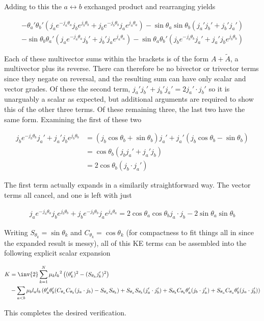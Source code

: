Adding to this the $a \leftrightarrow b$ exchanged product and rearranging yields

\begin{align*}
- \theta_a' \theta_b' (j_a e^{-j_a \theta_a} j_b e^{j_b\theta_b} + j_b e^{-j_b \theta_b} j_a e^{j_a\theta_a} ) - \sin\theta_a \sin\theta_b (j_a' j_b' + j_b' j_a') \\
- \sin\theta_b \theta_a' ( j_a e^{-j_a \theta_a} j_b' + j_b' j_a e^{j_a \theta_a} )
- \sin\theta_a \theta_b' ( j_b e^{-j_b \theta_b} j_a' + j_a' j_b e^{j_b \theta_b} )
\end{align*}

Each of these multivector sums within the brackets is of the form $A + \tilde{A}$, a multivector plus its reverse.  There can therefore be no bivector or trivector terms since they negate on reversal, and the resulting sum can have only scalar and vector grades.  Of these the second term, $j_a' j_b' + j_b' j_a' = 2 j_a' \cdot j_b'$ so it is unarguably a scalar as expected, but additional arguments are required to show this of the other three terms.  Of these remaining three, the last two have the same form.  Examining the first of these two

\begin{align*}
j_b e^{-j_b \theta_b} j_a' + j_a' j_b e^{j_b \theta_b} 
&=
(j_b \cos\theta_b + \sin\theta_b) j_a' + j_a' (j_b \cos\theta_b - \sin\theta_b) \\
&=
\cos\theta_b (j_b j_a' + j_a' j_b ) \\
&=
2 \cos\theta_b (j_b \cdot j_a')
\end{align*}

The first term actually expands in a similarily straightforward way.  The vector terms all cancel, and one is left with just

\begin{align*}
j_a e^{-j_a \theta_a} j_b e^{j_b\theta_b} + j_b e^{-j_b \theta_b} j_a e^{j_a\theta_a} 
= 
2 \cos\theta_a\cos\theta_b j_a \cdot j_b - 2 \sin\theta_a \sin\theta_b 
\end{align*}

Writing $S_{\theta_k} = \sin\theta_k$ and $C_{\theta_k} = \cos\theta_k$ (for compactness to fit things all in since the expanded result is messy), all of this KE terms can be assembled into the following explicit scalar expansion

\begin{align*}
K &=
\inv{2}
\sum_{k=1}^N
\mu_k
{l_k}^2
\left( (\theta_k')^2 - (S_{\theta_k} j_k')^2 \right) \\
&-
\sum_{a<b}
\mu_b
l_a l_b
\left(
\theta_a' \theta_b' (C_{\theta_a}C_{\theta_b} (j_a \cdot j_b) - S_{\theta_a} S_{\theta_b} )
+S_{\theta_a} S_{\theta_b} (j_a' \cdot j_b')
+S_{\theta_b} C_{\theta_b} \theta_a' (j_b \cdot j_a')
+S_{\theta_a} C_{\theta_a} \theta_b' (j_a \cdot j_b')
\right)
\end{align*}

This completes the desired verification.

\EndNoBibArticle
